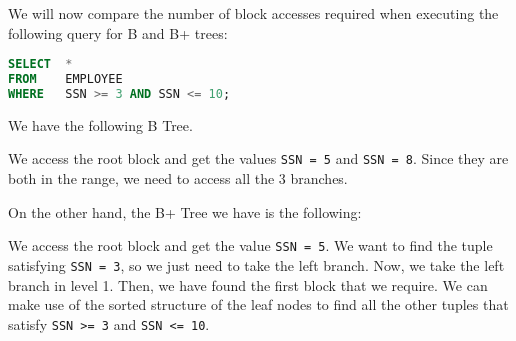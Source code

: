 \documentclass[a4paper, openany]{memoir}
\newcommand{\bnode}[3]{
    \draw (0+#1, 0+#2) -- (4.25+#1, 0+#2)
        -- (4.25+#1, 0.5+#2) 
        -- (0+#1, 0.5+#2)
        -- cycle;
    \foreach \i in {0.75, 1.75, 2.5, 3.5} {
        \draw (\i+#1, 0+#2) -- (\i+#1, 0.5+#2);
    }
    \foreach \i in {0, 1.75, 3.5} {
        \draw[fill=black] (\i+0.75/2+#1, 0.25+#2) circle (2pt);
    }
    \foreach \i in {0.75, 2.5} {
        \filldraw[red] (\i+0.75+#1, 0.25+#2) circle (2pt);
    }
    \foreach \x[count=\i] in {#3} {
        \node at (1.75*\i+#1-0.675, 0.25+#2) {\texttt{\x}};
    }
}
\newcommand{\bplusinternalnodesng}[3]{
    \draw (0+#1, 0+#2) -- (5*0.75+#1, 0+#2)
    -- (5*0.75+#1, 0.5+#2) 
    -- (0+#1, 0.5+#2)
    -- cycle;
    \foreach \i in {1, 2, 3, 4} {
        \draw (\i*0.75+#1, 0+#2) -- (\i*0.75+#1, 0.5+#2);
    }
    \foreach \i in {0, 2} {
        \draw[fill=black] (\i*0.75+0.75/2+#1, 0.25+#2) circle (2pt);
    }
    \foreach \x[count=\i] in {#3} {
        \node at (\i*0.75*2-0.75+0.75/2+#1, 0.25+#2) {\texttt{\x}};
    }
}
\newcommand{\bplusinternalnodedbl}[3]{
    \draw (0+#1, 0+#2) -- (5*0.75+#1, 0+#2)
    -- (5*0.75+#1, 0.5+#2) 
    -- (0+#1, 0.5+#2)
    -- cycle;
    \foreach \i in {1, 2, 3, 4} {
        \draw (\i*0.75+#1, 0+#2) -- (\i*0.75+#1, 0.5+#2);
    }
    \foreach \i in {0, 2, 4} {
        \draw[fill=black] (\i*0.75+0.75/2+#1, 0.25+#2) circle (2pt);
    }
    \foreach \x[count=\i] in {#3} {
        \node at (\i*0.75*2-0.75+0.75/2+#1, 0.25+#2) {\texttt{\x}};
    }
}
\newcommand{\bplusleafnodedbl}[3]{
    \draw (0+#1, 0+#2) -- (2+#1, 0+#2)
    -- (2+#1, 0.5+#2)
    -- (0+#1, 0.5+#2)
    -- cycle;

    \draw (1+#1, 0+#2) -- (1+#1, 0.5+#2);

    \foreach \x[count=\i] in {#3} {
        \filldraw[red] (\i-0.25+#1, 0.25+#2) circle (2pt);
        \node at (\i-0.75+#1, 0.25+#2) {\texttt{\x}};
    }
}
\newcommand{\bplusleafnodesng}[3]{
    \draw (0+#1, 0+#2) -- (1+#1, 0+#2)
    -- (1+#1, 0.5+#2)
    -- (0+#1, 0.5+#2)
    -- cycle;

    \filldraw[red] (0.75+#1, 0.25+#2) circle (2pt);
    \node at (0.25+#1, 0.25+#2) {\texttt{#3}};
}
\begin{document}
We will now compare the number of block accesses required when executing the following query for B and B+ trees:
\begin{lstlisting}[language=SQL]
SELECT  * 
FROM    EMPLOYEE
WHERE   SSN >= 3 AND SSN <= 10;
\end{lstlisting}
We have the following B Tree.
\begin{figure}[H]
    \centering
\end{figure}
\noindent We access the root block and get the values \texttt{SSN = 5} and \texttt{SSN = 8}. Since they are both in the range, we need to access all the 3 branches. 

On the other hand, the B+ Tree we have is the following:
\begin{figure}[H]
    \centering
\end{figure}
\noindent We access the root block and get the value \texttt{SSN = 5}. We want to find the tuple satisfying \texttt{SSN = 3}, so we just need to take the left branch. Now, we take the left branch in level 1. Then, we have found the first block that we require. We can make use of the sorted structure of the leaf nodes to find all the other tuples that satisfy \texttt{SSN >= 3} and \texttt{SSN <= 10}.
\end{document}
